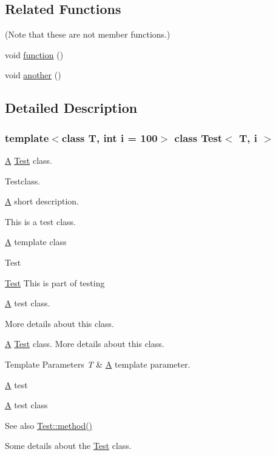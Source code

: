 \subsection*{Related Functions}
(Note that these are not member functions.) \begin{DoxyCompactItemize}
\item 
void \mbox{\hyperlink{class_test_a51a683fa4fcec142ab1574e00a7b6860}{function}} ()
\item 
void \mbox{\hyperlink{class_test_a1283d836e0611ff772c1b06a31ecbbfe}{another}} ()
\end{DoxyCompactItemize}


\subsection{Detailed Description}
\subsubsection*{template$<$class T, int i = 100$>$\newline
class Test$<$ T, i $>$}

\mbox{\hyperlink{class_a}{A}} \mbox{\hyperlink{class_test}{Test}} class. 

Testclass.

\mbox{\hyperlink{class_a}{A}} short description.

This is a test class.

\mbox{\hyperlink{class_a}{A}} template class

\begin{DoxyRefDesc}{Test}
\item[\mbox{\hyperlink{test__test000001}{Test}}]This is part of testing \end{DoxyRefDesc}


\mbox{\hyperlink{class_a}{A}} test class.

More details about this class.

\mbox{\hyperlink{class_a}{A}} \mbox{\hyperlink{class_test}{Test}} class. More details about this class. 
\begin{DoxyTemplParams}{Template Parameters}
{\em T} & \mbox{\hyperlink{class_a}{A}} template parameter.\\
\hline
\end{DoxyTemplParams}
\mbox{\hyperlink{class_a}{A}} test

\mbox{\hyperlink{class_a}{A}} test class \begin{DoxySeeAlso}{See also}
\mbox{\hyperlink{class_test_a2a91524f180391310e4e2735599b3f18}{Test\+::method()}}
\end{DoxySeeAlso}
Some details about the \mbox{\hyperlink{class_test}{Test}} class.

